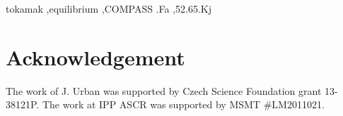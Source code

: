 \documentclass[preprint,5p,times]{elsarticle}
\begin{document}
\begin{frontmatter}


 
\begin{keyword}
tokamak  \sep equilibrium \sep COMPASS 
.Fa \sep 52.65.Kj
\end{keyword}

\end{frontmatter}






\section*{Acknowledgement}
The work of J. Urban was supported by Czech Science Foundation grant 13-38121P.
The work at IPP ASCR was supported by MSMT \#LM2011021. 

% 



{}

% 

% 

% 
\end{document}
